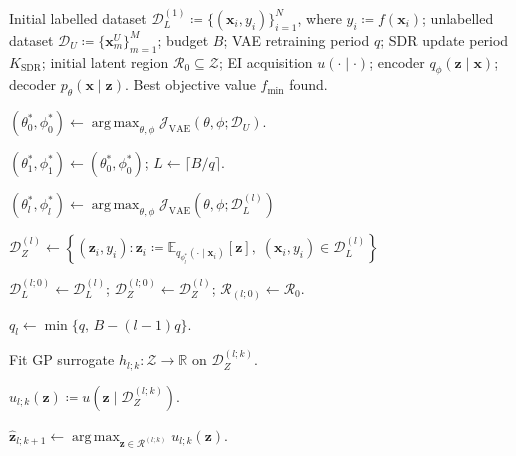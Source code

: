 \documentclass[pdflatex,sn-mathphys-num]{sn-jnl}%
\theoremstyle{thmstyleone}%
\theoremstyle{thmstyletwo}%
\theoremstyle{thmstylethree}%
\begin{document}
\begin{algorithm}
\caption{BO--VAE with SDR and Periodic VAE Retraining}
\label{BOVAE-retraining}
\begin{algorithmic}[1]
\Require Initial labelled dataset
\(\mathcal D_L^{(1)}\coloneq \{(\mathbf x_i,y_i)\}_{i=1}^{N}\), where
\(y_i\coloneq f(\mathbf x_i)\);
unlabelled dataset
\(\mathcal D_U\coloneq\{\mathbf x_m^U\}_{m=1}^{M}\);
budget \(B\);
VAE retraining period \(q\);
SDR update period \(K_{\mathrm{SDR}}\);
initial latent region \(\mathcal R_0\subseteq\mathcal Z\);
EI acquisition \(u(\cdot\mid\cdot)\);
encoder \(q_\phi(\mathbf z\mid\mathbf x)\);
decoder \(p_\theta(\mathbf x\mid\mathbf z)\).
\Ensure Best objective value \(f_{\min}\) found.

\State
\((\theta_0^\ast,\phi_0^\ast)
\gets
\operatorname*{arg\,max}_{\theta,\phi}
\mathcal J_{\mathrm{VAE}}(\theta,\phi;\mathcal D_U)\).
\label{alg:pretrain}

\State
\((\theta_1^\ast,\phi_1^\ast)\gets(\theta_0^\ast,\phi_0^\ast)\);
\quad \(L\gets\lceil B/q\rceil\).

\label{alg:outer-start}

  \State
  \((\theta_l^\ast,\phi_l^\ast)
  \gets
  \operatorname*{arg\,max}_{\theta,\phi}
  \mathcal J_{\mathrm{VAE}}(\theta,\phi;\mathcal D_L^{(l)})\)
  \label{alg:retrain}

  \State
  \(\mathcal D_Z^{(l)}
  \gets
  \left\{
  (\mathbf z_i,y_i):
  \mathbf z_i
  \coloneq
  \mathbb E_{q_{\phi_l^\ast}(\cdot\mid\mathbf x_i)}[\mathbf z],
  \;
  (\mathbf x_i,y_i)\in\mathcal D_L^{(l)}
  \right\}\)
  \label{alg:encode}

  \State
  \(\mathcal D_L^{(l;0)}\gets \mathcal D_L^{(l)}\);
  \quad
  \(\mathcal D_Z^{(l;0)}\gets \mathcal D_Z^{(l)}\);
  \quad
  \(\mathcal R_{(l;0)}\gets \mathcal R_0\).

  \State \(q_l\gets \min\{q,\,B-(l-1)q\}\).

  \label{alg:inner-start}

    \State Fit GP surrogate \(h_{l;k}:\mathcal Z\to\mathbb R\) on
    \(\mathcal D_Z^{(l;k)}\).

    \State
    \(u_{l;k}(\mathbf z)
    \coloneq
    u(\mathbf z\mid\mathcal D_Z^{(l;k)})\).

    \State
    \(\hat{\mathbf z}_{l;k+1}
    \gets
    \operatorname*{arg\,max}_{\mathbf z\in\mathcal R^{(l;k)}}
    u_{l;k}(\mathbf z)\).


\end{algorithmic}
\end{algorithm}
\end{document}
